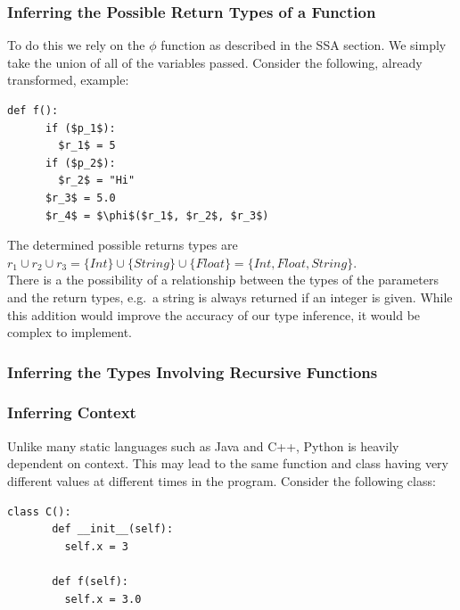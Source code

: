\documentclass[12pt, titlepage]{article}
\begin{document}
\subsubsection{Inferring the Possible Return Types of a Function}
To do this we rely on the $\phi$ function as described in the SSA section. We simply take the union of all of the variables passed. Consider the following, already transformed, example:
\begin{lstlisting}[mathescape]
	def f():
	  if ($p_1$):
	    $r_1$ = 5
	  if ($p_2$):
	    $r_2$ = "Hi"
	  $r_3$ = 5.0
	  $r_4$ = $\phi$($r_1$, $r_2$, $r_3$)
\end{lstlisting}
The determined possible returns types are $r_1 \cup r_2 \cup r_3 = \{Int\} \cup \{String\} \cup \{Float\} = \{Int, Float, String\}$. \\
There is a the possibility of a relationship between the types of the parameters and the return types, e.g.\ a string is always returned if an integer is given. While this addition would improve the accuracy of our type inference, it would be complex to implement.

\subsubsection{Inferring the Types Involving Recursive Functions}


\subsubsection{Inferring Context}
Unlike many static languages such as Java and C++, Python is heavily dependent on context. This may lead to the same function and class having very different values at different times in the program. Consider the following class:
\begin{lstlisting}[mathescape]
    class C():
       def __init__(self):
         self.x = 3
			
       def f(self):
         self.x = 3.0
\end{lstlisting}
\end{document}
